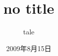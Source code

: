 \documentclass[b5paper, 10pt]{article}
\begin{document}
\title{no title}
\author{tale}
\date{2009年8月15日}

\setcounter{tocdepth}{2}
\tableofcontents

\end{document}
